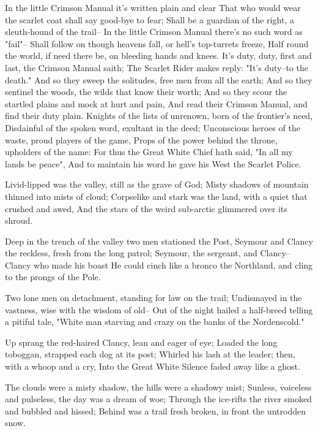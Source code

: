 
\begin{poemblock}
 In the little Crimson Manual it's written plain and clear
 That who would wear the scarlet coat shall say good-bye to fear;
 Shall be a guardian of the right, a sleuth-hound of the trail--
 In the little Crimson Manual there's no such word as "fail"--
 Shall follow on though heavens fall, or hell's top-turrets freeze,
 Half round the world, if need there be, on bleeding hands and knees.
 It's duty, duty, first and last, the Crimson Manual saith;
 The Scarlet Rider makes reply:  "It's duty--to the death."
 And so they sweep the solitudes, free men from all the earth;
 And so they sentinel the woods, the wilds that know their worth;
 And so they scour the startled plains and mock at hurt and pain,
 And read their Crimson Manual, and find their duty plain.
 Knights of the lists of unrenown, born of the frontier's need,
 Disdainful of the spoken word, exultant in the deed;
 Unconscious heroes of the waste, proud players of the game,
 Props of the power behind the throne, upholders of the name:
 For thus the Great White Chief hath said, "In all my lands be peace",
 And to maintain his word he gave his West the Scarlet Police.

 Livid-lipped was the valley, still as the grave of God;
  Misty shadows of mountain thinned into mists of cloud;
 Corpselike and stark was the land, with a quiet that crushed and awed,
  And the stars of the weird sub-arctic glimmered over its shroud.

 Deep in the trench of the valley two men stationed the Post,
  Seymour and Clancy the reckless, fresh from the long patrol;
 Seymour, the sergeant, and Clancy--Clancy who made his boast
  He could cinch like a bronco the Northland,
and cling to the prongs of the Pole.

 Two lone men on detachment, standing for law on the trail;
  Undismayed in the vastness, wise with the wisdom of old--
 Out of the night hailed a half-breed telling a pitiful tale,
  "White man starving and crazy on the banks of the Nordenscold."

 Up sprang the red-haired Clancy, lean and eager of eye;
  Loaded the long toboggan, strapped each dog at its post;
 Whirled his lash at the leader; then, with a whoop and a cry,
  Into the Great White Silence faded away like a ghost.

 The clouds were a misty shadow, the hills were a shadowy mist;
  Sunless, voiceless and pulseless, the day was a dream of woe;
 Through the ice-rifts the river smoked and bubbled and hissed;
  Behind was a trail fresh broken, in front the untrodden snow.


\end{poemblock}
